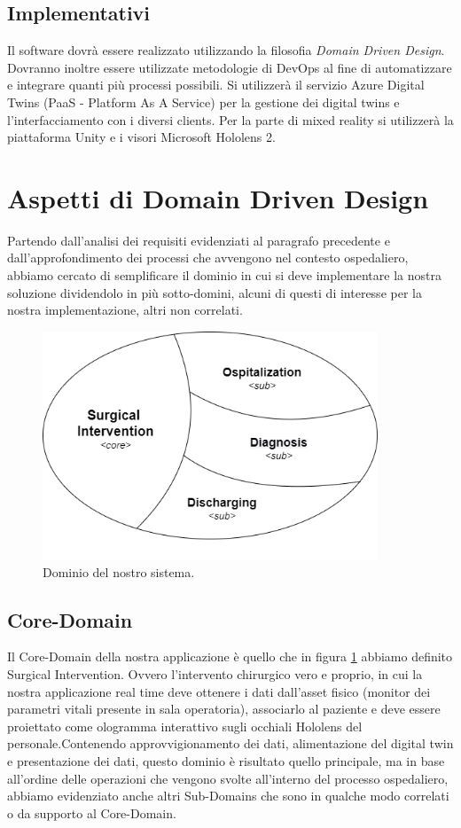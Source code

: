 \subsection{Implementativi}
Il software dovrà essere realizzato utilizzando la filosofia \textit{Domain Driven Design}. Dovranno inoltre essere utilizzate metodologie di DevOps al fine di automatizzare e integrare quanti più processi possibili. Si utilizzerà il servizio Azure Digital Twins (PaaS - Platform As A Service) per la gestione dei digital twins e l'interfacciamento con i diversi clients. Per la parte di mixed reality si utilizzerà la piattaforma Unity e i visori Microsoft Hololens 2.

\section{Aspetti di Domain Driven Design}

Partendo dall'analisi dei requisiti evidenziati al paragrafo precedente e dall'approfondimento dei processi che avvengono nel contesto ospedaliero, abbiamo cercato di semplificare il dominio in cui si deve implementare la nostra soluzione dividendolo in più sotto-domini, alcuni di questi di interesse per la nostra implementazione, altri non correlati.

\begin{figure}[H]
    \includegraphics[width=10cm]{Images/domain_model.png}
    \centering
    \caption{\label{pic:domain-model}Dominio del nostro sistema.}
\end{figure}

\subsection{Core-Domain}
Il Core-Domain della nostra applicazione è quello che in figura \ref{pic:domain-model} abbiamo definito Surgical Intervention. Ovvero l'intervento chirurgico vero e proprio, in cui la nostra applicazione real time deve ottenere i dati dall'asset fisico (monitor dei parametri vitali presente in sala operatoria), associarlo al paziente e deve essere proiettato come ologramma interattivo sugli occhiali Hololens del personale.\newline \newline Contenendo approvvigionamento dei dati, alimentazione del digital twin e presentazione dei dati, questo dominio è risultato quello principale, ma in base all'ordine delle operazioni che vengono svolte all'interno del processo ospedaliero, abbiamo evidenziato anche altri Sub-Domains che sono in qualche modo correlati o da supporto al Core-Domain.

